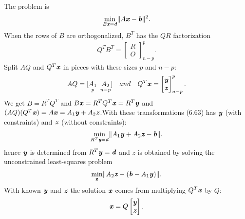 The problem is
\begin{align}
\min_{B\textbf{\textit{x}}=\textbf{\textit{d}}} \lVert A\textbf{\textit{x}}-\textbf{\textit{b}} \rVert^{2}.
\end{align}
When the rows of $B$ are orthogonalized, $B^{T}$ has the $QR$ factorization
\begin{align*}
Q^{T}B^{T} = 
\begin{bmatrix}
R\\
\textit{O}
\end{bmatrix}^{p}_{n-p}.
\end{align*}
Split $A Q$ and $Q^{T}\textbf{\textit{x}}$ in pieces with these sizes $p$ and $n-p$:
\begin{align*}
AQ = [\mathop{A_{1}}_{p}  \ \mathop{A_{2}}_{n-p}] \quad  and \quad  Q^{T}\textbf{\textit{x}} = 
\begin{bmatrix}
\textbf{\textit{y}}\\
\textbf{\textit{z}}
\end{bmatrix}
^{p}_{n-p}.
\end{align*}
We get $ B = R^{T}Q^{T}$ and $ B\textbf{\textit{x}} =R^{T}Q^{T}\textbf{\textit{x}} = R^{T}\textbf{\textit{y}} $ and $ (AQ)(Q^{T} \textbf{\textit{x}}) = A\textbf{\textit{x}} = A_{1}\textbf{\textit{y}} + A_{2}\textbf{\textit{z}} $.With these transformations (6.63) has $\textbf{\textit{y}}$ (with constraints) and $\textbf{\textit{z}}$ (without constraints):
\begin{align}
\min_{R^{T}\textbf{\textit{y}}=\textbf{\textit{d}}} \lVert A_{1}\textbf{\textit{y}} + A_{2}\textbf{\textit{z}} -\textbf{\textit{b}} \rVert.
\end{align}
hence $ \textbf{\textit{y}}$ is determined from $ R^{T}\textbf{\textit{y}}=\textbf{\textit{d}}$ and $z$ is obtained by solving the unconstrained least-squares problem
\begin{align}
\min_{\textbf{z}} \lVert A_{2}\textbf{\textit{z}} -(\textbf{\textit{b}} - A_{1}\textbf{\textit{y}} )  \rVert.
\end{align}
With known $\textbf{\textit{y}}$ and $\textbf{\textit{z}}$ the solution $\textbf{\textit{x}}$ comes from multiplying $Q^{T}\textbf{\textit{x}}$ by $Q$:
\begin{align*}
\textbf{\textit{x}} = Q
\begin{bmatrix}
\textbf{\textit{y}}\\
\textbf{\textit{z}}
\end{bmatrix}.
\end{align*}

